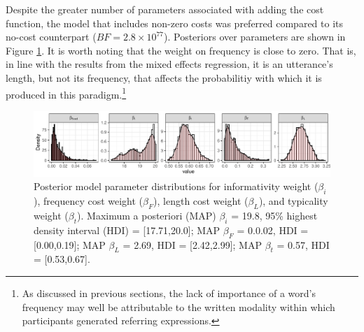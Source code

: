\documentclass[11pt]{article}
\newcommand{\jd}[1]{\textcolor{Red}{[jd: #1]}}
\newcommand{\ndg}[1]{\textcolor{Green}{[ndg: #1]}}
\newcommand{\figref}[1]{Figure \ref{#1}}
\begin{document}
Despite the greater number of parameters associated with adding the cost function, the  model that includes non-zero costs was preferred compared to its no-cost counterpart ($BF = 2.8 \times 10^{77}$). Posteriors over parameters are shown in \figref{fig:nomparamposteriors}. It is worth noting that the weight on frequency is close to zero. That is, in line with the results from the mixed effects regression, it is an utterance's length, but not its frequency, that affects the probabilitiy with which it is produced in this paradigm.\footnote{As discussed in previous sections, the lack of importance of a word's frequency may well be attributable to the written modality within which participants generated referring expressions.} 


\begin{figure}
\centering
\includegraphics[width=\textwidth]{pics/exp3-paramposteriors}
\caption{Posterior model parameter distributions for informativity weight ($\beta_i$), frequency cost weight  ($\beta_{F}$), length cost weight ($\beta_{L}$), and typicality weight ($\beta_t $). Maximum a posteriori (MAP)  $\beta_i$ = 19.8, 95\% highest density interval (HDI) = [17.71,20.0]; MAP $\beta_{F}$ = 0.0.02, HDI = [0.00,0.19]; MAP $\beta_{L}$ = 2.69, HDI = [2.42,2.99]; MAP $\beta_t $ = 0.57, HDI = [0.53,0.67].}
\label{fig:nomparamposteriors}
\end{figure}
\end{document}
